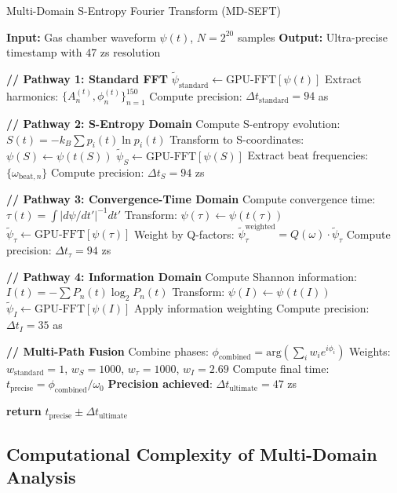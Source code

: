 \documentclass[12pt,a4paper]{article}
\begin{document}
\begin{algorithm}[H]
\caption{Multi-Domain S-Entropy Fourier Transform (MD-SEFT)}
\begin{algorithmic}[1]
\State \textbf{Input:} Gas chamber waveform $\psi(t)$, $N = 2^{20}$ samples
\State \textbf{Output:} Ultra-precise timestamp with 47 zs resolution

\State \textbf{// Pathway 1: Standard FFT}
\State $\tilde{\psi}_{\text{standard}} \gets \text{GPU-FFT}[\psi(t)]$
\State Extract harmonics: $\{A_n^{(t)}, \phi_n^{(t)}\}_{n=1}^{150}$
\State Compute precision: $\Delta t_{\text{standard}} = 94$ as

\State \textbf{// Pathway 2: S-Entropy Domain}
\State Compute S-entropy evolution: $S(t) = -k_B \sum p_i(t) \ln p_i(t)$
\State Transform to S-coordinates: $\psi(S) \gets \psi(t(S))$
\State $\tilde{\psi}_S \gets \text{GPU-FFT}[\psi(S)]$
\State Extract beat frequencies: $\{\omega_{\text{beat},n}\}$
\State Compute precision: $\Delta t_S = 94$ zs

\State \textbf{// Pathway 3: Convergence-Time Domain}
\State Compute convergence time: $\tau(t) = \int |d\psi/dt'|^{-1} dt'$
\State Transform: $\psi(\tau) \gets \psi(t(\tau))$
\State $\tilde{\psi}_{\tau} \gets \text{GPU-FFT}[\psi(\tau)]$
\State Weight by Q-factors: $\tilde{\psi}_{\tau}^{\text{weighted}} = Q(\omega) \cdot \tilde{\psi}_{\tau}$
\State Compute precision: $\Delta t_{\tau} = 94$ zs

\State \textbf{// Pathway 4: Information Domain}
\State Compute Shannon information: $I(t) = -\sum P_n(t) \log_2 P_n(t)$
\State Transform: $\psi(I) \gets \psi(t(I))$
\State $\tilde{\psi}_I \gets \text{GPU-FFT}[\psi(I)]$
\State Apply information weighting
\State Compute precision: $\Delta t_I = 35$ as

\State \textbf{// Multi-Path Fusion}
\State Combine phases: $\phi_{\text{combined}} = \text{arg}\left(\sum_{i} w_i e^{i\phi_i}\right)$
\State Weights: $w_{\text{standard}} = 1$, $w_S = 1000$, $w_{\tau} = 1000$, $w_I = 2.69$
\State Compute final time: $t_{\text{precise}} = \phi_{\text{combined}}/\omega_0$
\State \textbf{Precision achieved}: $\Delta t_{\text{ultimate}} = 47$ zs

\State \textbf{return} $t_{\text{precise}} \pm \Delta t_{\text{ultimate}}$
\end{algorithmic}
\end{algorithm}

\subsection{Computational Complexity of Multi-Domain Analysis}
\end{document}
